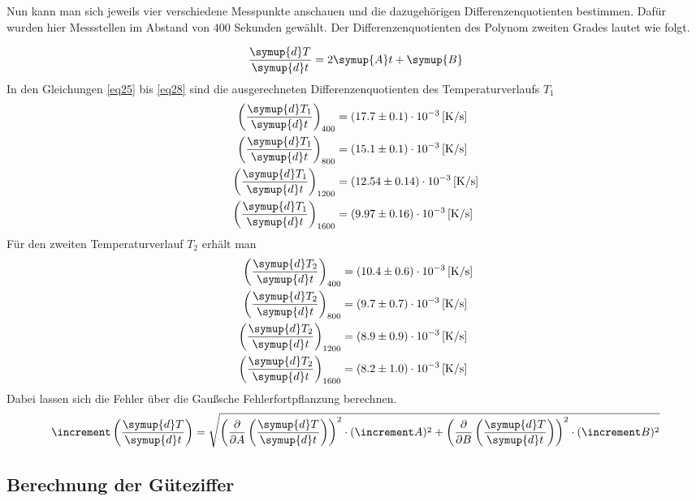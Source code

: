 \begin{flushleft}
Nun kann man sich jeweils vier verschiedene Messpunkte anschauen und die dazugehörigen Differenzenquotienten bestimmen. Dafür wurden hier
Messstellen im Abstand von 400 Sekunden gewählt.
Der Differenzenquotienten des Polynom zweiten Grades lautet wie folgt.
\end{flushleft}
\begin{equation}
\frac{\symup{d}T}{\symup{d}t} = 2 \symup{A} t + \symup{B}
\end{equation}
In den Gleichungen \eqref{eq25} bis \eqref{eq28} sind die ausgerechneten Differenzenquotienten des Temperaturverlaufs $T_{1}$
\begin{align}
\left( \frac{\symup{d}T_{1}}{\symup{d}t}\right)_{400} &= (17.7\pm0.1)\cdot 10^{-3} \, \text{[K/s]} \label{eq25}\\
\left(\frac{\symup{d}T_{1}}{\symup{d}t}\right)_{800} &= (15.1\pm0.1)\cdot 10^{-3} \,\text{[K/s]}\\
\left(\frac{\symup{d}T_{1}}{\symup{d}t}\right)_{1200} &= (12.54\pm0.14)\cdot 10^{-3} \, \text{[K/s]}\\
\left(\frac{\symup{d}T_{1}}{\symup{d}t}\right)_{1600} &= (9.97\pm0.16)\cdot 10^{-3} \, \text{[K/s]} \label{eq28}
\end{align}
Für den zweiten Temperaturverlauf $T_{2}$ erhält man
\begin{align}
\left( \frac{\symup{d}T_{2}}{\symup{d}t}\right)_{400} &= (10.4\pm0.6)\cdot 10^{-3} \, \text{[K/s]} \label{eq29}\\
\left(\frac{\symup{d}T_{2}}{\symup{d}t}\right)_{800} &= (9.7\pm0.7)\cdot 10^{-3} \,\text{[K/s]}\\
\left(\frac{\symup{d}T_{2}}{\symup{d}t}\right)_{1200} &= (8.9\pm0.9)\cdot 10^{-3} \, \text{[K/s]}\\
\left(\frac{\symup{d}T_{2}}{\symup{d}t}\right)_{1600} &= (8.2\pm1.0)\cdot 10^{-3} \, \text{[K/s]} \label{eq32}
\end{align}
Dabei lassen sich die Fehler über die Gaußsche Fehlerfortpflanzung berechnen.
\begin{equation}
  \increment \left( \frac{\symup{d}T}{\symup{d}t}\right) = \sqrt{\left( \frac{\partial}{\partial A} \left( \frac{\symup{d}T}{\symup{d}t} \right)\right)^{2} \cdot (\increment A)^{2} + \left( \frac{\partial}{\partial B} \left( \frac{\symup{d}T}{\symup{d}t} \right)\right)^{2} \cdot (\increment B)^{2} }
  \label{eqn:gaussianmistake}
\end{equation}
\subsection{Berechnung der Güteziffer}
